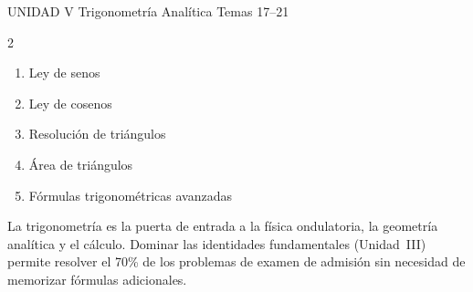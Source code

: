 \begin{tcolorbox}[enhanced, colback=AzulPizarra, colframe=DoradoAcadémico,
    arc=3pt, boxrule=1pt, left=8pt, right=8pt, top=5pt, bottom=5pt,
    fontupper=\sffamily\bfseries\color{white}]
  UNIDAD V \hfill Trigonometría Analítica \hfill Temas 17–21
\end{tcolorbox}
\begin{multicols}{2}
  \begin{enumerate}[label=\textcolor{AzulPizarra}{\textbf{\arabic*.}},
      leftmargin=2em, itemsep=1pt, start=17]
    \item Ley de senos
    \item Ley de cosenos
    \item Resolución de triángulos
    \item Área de triángulos
    \item Fórmulas trigonométricas avanzadas
  \end{enumerate}
\end{multicols}

\vspace{0.6cm}

\begin{cajatip}
  La trigonometría es la puerta de entrada a la física ondulatoria, la geometría
  analítica y el cálculo. Dominar las identidades fundamentales (Unidad~III)
  permite resolver el 70\% de los problemas de examen de admisión sin necesidad
  de memorizar fórmulas adicionales.
\end{cajatip}

\newpage